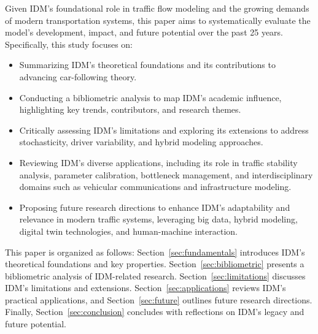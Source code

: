 \documentclass[a4paper,fleqn]{cas-sc}
\begin{document}
Given IDM’s foundational role in traffic flow modeling and the growing demands of modern transportation systems, this paper aims to systematically evaluate the model’s development, impact, and future potential over the past 25 years. Specifically, this study focuses on:

\begin{itemize}
    \item Summarizing IDM’s theoretical foundations and its contributions to advancing car-following theory.
    \item Conducting a bibliometric analysis to map IDM’s academic influence, highlighting key trends, contributors, and research themes.
    \item Critically assessing IDM’s limitations and exploring its extensions to address stochasticity, driver variability, and hybrid modeling approaches.
    \item Reviewing IDM’s diverse applications, including its role in traffic stability analysis, parameter calibration, bottleneck management, and interdisciplinary domains such as vehicular communications and infrastructure modeling.
    \item Proposing future research directions to enhance IDM’s adaptability and relevance in modern traffic systems, leveraging big data, hybrid modeling, digital twin technologies, and human-machine interaction.
\end{itemize}

This paper is organized as follows: Section~\ref{sec:fundamentals} introduces IDM’s theoretical foundations and key properties. Section~\ref{sec:bibliometric} presents a bibliometric analysis of IDM-related research. Section~\ref{sec:limitations} discusses IDM’s limitations and extensions. Section~\ref{sec:applications} reviews IDM’s practical applications, and Section~\ref{sec:future} outlines future research directions. Finally, Section~\ref{sec:conclusion} concludes with reflections on IDM’s legacy and future potential.
\end{document}

